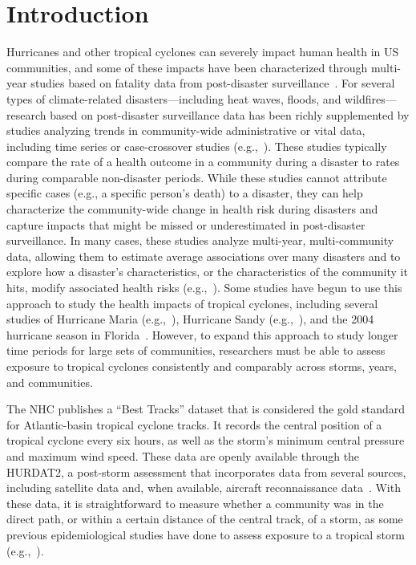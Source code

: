 \section*{Introduction}

\acresetall

Hurricanes and other tropical cyclones can severely impact human health in
\ac{US} communities, and some of these impacts have been characterized through
multi-year studies based on fatality data from post-disaster
surveillance~\parencite{rappaport2000, rappaport2014fatalities,
rappaport2016fatalities, czajkowski2010fatal, czajkowski2011, moore2012}.  For
several types of climate-related disasters---including heat waves, floods, and
wildfires---research based on post-disaster surveillance data has been richly
supplemented by studies analyzing trends in community-wide administrative or
vital data, including time series or case-crossover studies
(e.g.,~\cite{anderson2010heat, son2012impact, haikerwal2015impact,
liu2017wildfire, milojevic2017mental}).  These studies typically compare the
rate of a health outcome in a community during a disaster to rates during
comparable non-disaster periods.  While these studies cannot attribute specific
cases (e.g., a specific person's death) to a disaster, they can help
characterize the community-wide change in health risk during disasters and
capture impacts that might be missed or underestimated in post-disaster
surveillance.  In many cases, these studies analyze multi-year, multi-community
data, allowing them to estimate average associations over many disasters and to
explore how a disaster's characteristics, or the characteristics of the
community it hits, modify associated health risks (e.g.,~\cite{anderson2010heat,
son2012impact, liu2017wildfire}).  Some studies have begun to use this approach
to study the health impacts of tropical cyclones, including several studies of
Hurricane Maria (e.g.,~\cite{santos2018use, santos2018differential}), Hurricane
Sandy (e.g.,~\cite{kim2016, mongin2017, swerdel2014}), and the 2004 hurricane
season in Florida~\parencite{mckinney2011}.  However, to expand this approach
to study longer time periods for large sets of communities, researchers must be
able to assess exposure to tropical cyclones consistently and comparably across
storms, years, and communities.  

The \ac{NHC} publishes a ``Best Tracks'' dataset that is considered the gold
standard for Atlantic-basin tropical cyclone tracks.  It records the central
position of a tropical cyclone every six hours, as well as the storm's minimum
central pressure and maximum wind speed.  These data are openly available
through the \ac{HURDAT2}, a post-storm assessment that incorporates data from
several sources, including satellite data and, when available, aircraft
reconnaissance data~\parencite{landsea2013, jarvinen1988}.  With these data, it
is straightforward to measure whether a community was in the direct path, or
within a certain distance of the central track, of a storm, as some previous
epidemiological studies have done to assess exposure to a tropical storm
(e.g.,~\cite{currie2013, kinney2008, caillouet2008increase}).

